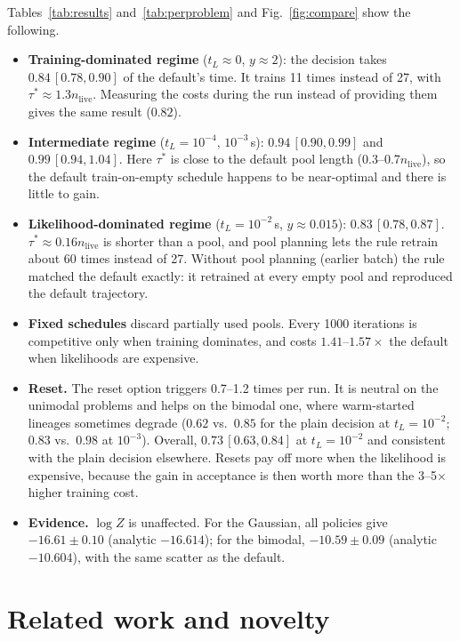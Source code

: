 \documentclass[11pt,a4paper]{article}
\newcommand{\nlive}{n_{\mathrm{live}}}
\begin{document}
Tables~\ref{tab:results} and~\ref{tab:perproblem} and Fig.~\ref{fig:compare}
show the following.
\begin{itemize}
  \item \textbf{Training-dominated regime} ($t_L\approx0$, $y\approx2$):
        the decision takes $0.84\,[0.78, 0.90]$ of the default's time. It
        trains 11 times instead of 27, with $\tau^*\approx1.3\nlive$.
        Measuring the costs during the run instead of providing them gives
        the same result ($0.82$).
  \item \textbf{Intermediate regime} ($t_L=10^{-4}$, $10^{-3}$\,s):
        $0.94\,[0.90,0.99]$ and $0.99\,[0.94,1.04]$. Here $\tau^*$ is close to
        the default pool length (0.3--0.7$\nlive$), so the default
        train-on-empty schedule happens to be near-optimal and there is little
        to gain.
  \item \textbf{Likelihood-dominated regime} ($t_L=10^{-2}$\,s, $y\approx0.015$):
        $0.83\,[0.78, 0.87]$. $\tau^*\approx0.16\nlive$ is shorter than a pool,
        and pool planning lets the rule retrain about 60 times instead of 27.
        Without pool planning (earlier batch) the rule matched the default
        exactly: it retrained at every empty pool and reproduced the default
        trajectory.
  \item \textbf{Fixed schedules} discard partially used pools. Every 1000
        iterations is competitive only when training dominates, and costs
        $1.41$--$1.57\times$ the default when likelihoods are expensive.
  \item \textbf{Reset.} The reset option triggers 0.7--1.2 times per run. It is
        neutral on the unimodal problems and helps on the bimodal one, where
        warm-started lineages sometimes degrade ($0.62$ vs.\ $0.85$ for the
        plain decision at $t_L=10^{-2}$; $0.83$ vs.\ $0.98$ at $10^{-3}$).
        Overall, $0.73\,[0.63,0.84]$ at $t_L=10^{-2}$ and consistent with
        the plain decision elsewhere. Resets pay off more when the likelihood
        is expensive, because the gain in acceptance is then worth more than
        the 3--5$\times$ higher training cost.
  \item \textbf{Evidence.} $\log Z$ is unaffected. For the Gaussian, all
        policies give $-16.61\pm0.10$ (analytic $-16.614$); for the bimodal,
        $-10.59\pm0.09$ (analytic $-10.604$), with the same scatter as the
        default.
\end{itemize}

\section{Related work and novelty}\label{sec:related}
\end{document}
